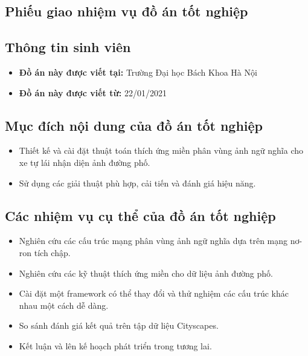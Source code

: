\documentclass[a4paper, 13pt, oneside]{report}
\begin{document}
\setcounter{page}{1}
\begin{spacing}{1.0}
    \fontsize{12}{12} \chapter*{ Phiếu giao nhiệm vụ đồ án tốt nghiệp}
    \section*{Thông tin sinh viên}
    \begin{itemize}
        \item \textbf{Đồ án này được viết tại:} Trường Đại học Bách Khoa Hà Nội 
        \item \textbf{Đồ án này được viết từ:} 22/01/2021 
    \end{itemize}
    \section*{Mục đích nội dung của đồ án tốt nghiệp}
        \begin{itemize}
        \item Thiết kế và cài đặt thuật toán thích ứng miền phân vùng ảnh ngữ nghĩa cho xe tự lái nhận diện ảnh đường phố.
        \item Sử dụng các giải thuật phù hợp, cải tiến và đánh giá hiệu năng.
        \end{itemize}
    \section*{Các nhiệm vụ cụ thể của đồ án tốt nghiệp}
        \begin{itemize}
        \item Nghiên cứu các cấu trúc mạng phân vùng ảnh ngữ nghĩa dựa trên mạng nơ-ron tích chập.
        \item Nghiên cứu các kỹ thuật thích ứng miền cho dữ liệu ảnh đường phố.
        \item Cài đặt một framework có thể thay đổi và thử nghiệm các cấu trúc khác nhau một cách dễ dàng.
        \item So sánh đánh giá kết quả trên tập dữ liệu Cityscapes.
        \item Kết luận và lên kế hoạch phát triển trong tương lai.
        \end{itemize}
    

\end{spacing}
\end{document}
